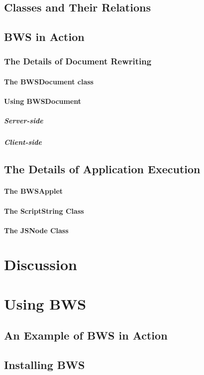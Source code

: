  \subsection{Classes and Their Relations}
 \subsection{BWS in Action}
  \subsubsection{The Details of Document Rewriting}
   \paragraph{The BWSDocument class}
   \paragraph{Using BWSDocument}
    \subparagraph{Server-side}
    \subparagraph{Client-side}
  \subsection{The Details of Application Execution}
   \paragraph{The BWSApplet}
   \paragraph{The ScriptString Class}
   \paragraph{The JSNode Class}
\section{Discussion}

\section{Using BWS}

 \subsection{An Example of BWS in Action}
 \subsection{Installing BWS}
